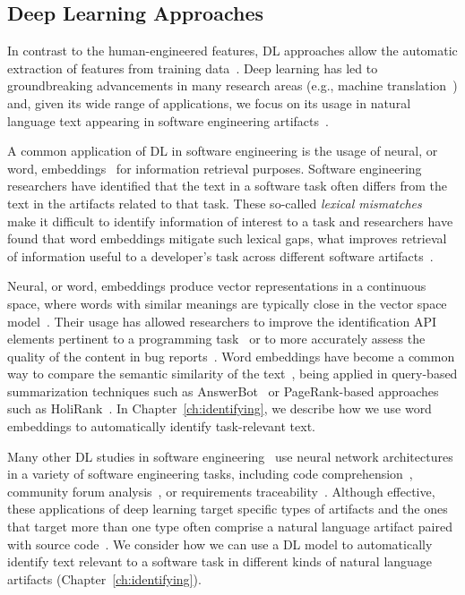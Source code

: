 \subsection{Deep Learning Approaches}
\label{cp2:deep-learning}





In contrast to the human-engineered features,
\acf{DL} approaches allow the automatic extraction of features 
from training data~\cite{Deng2018, zhang2021deep}.
Deep learning has led to groundbreaking advancements in many 
research areas (e.g., machine translation~\cite{lopez2008translation}) 
and, given its wide range of applications, 
we focus
on its usage in natural language text appearing in software engineering artifacts~\cite{ferreira2021, li2018deep, watson2022}.






A common application of \acs{DL} in software engineering is the usage of neural, or word, embeddings~\cite{Mikolov2013}
for information retrieval purposes. 
Software engineering researchers have identified that the text 
in a software task 
often differs from the text in the artifacts related to that task. 
These so-called \textit{lexical mismatches}~\cite{Ye2016, Huang2018} 
 make it difficult to identify information of interest 
to a task and researchers have found that word
embeddings mitigate such lexical gaps,
what improves retrieval of information useful to a developer's task
across different software artifacts~\cite{Ye2016}. 


Neural, or word, embeddings produce vector representations in a continuous space,
where words with similar meanings are typically close in the vector space model~\cite{harris1954distributional, mikolov2013efficient}. 
Their usage has allowed researchers to improve 
the identification API elements pertinent to a programming task~\cite{Ye2016} 
or to more accurately assess the quality of the content in bug reports~\cite{chaparro2019}.
Word embeddings have become a common way 
to compare the semantic similarity of the text~\cite{mihalcea2006},
being applied in query-based summarization techniques such as 
AnswerBot~\cite{Xu2017}
or PageRank-based approaches such as HoliRank~\cite{Ponzanelli2017}.
In Chapter~\ref{ch:identifying}, we describe how we use 
word embeddings to automatically identify task-relevant text.



Many other \acs{DL} studies in software engineering~\cite{ferreira2021,li2018deep, watson2022}
use neural network architectures 
in a variety of software engineering tasks, including
code comprehension~\cite{allamanis2015, mi2018}, 
community forum analysis~\cite{Lin2018, wang2019}, 
or requirements traceability~\cite{chen2019, guo2017}.
Although effective, these applications of deep learning
target specific
types of artifacts and the ones 
that target more than one type 
often comprise a natural language artifact 
paired with source code~\cite{watson2022}. 
We consider how we can use a \acs{DL}
model to automatically 
identify text relevant to a software task
in different kinds of natural language artifacts (Chapter~\ref{ch:identifying}).


